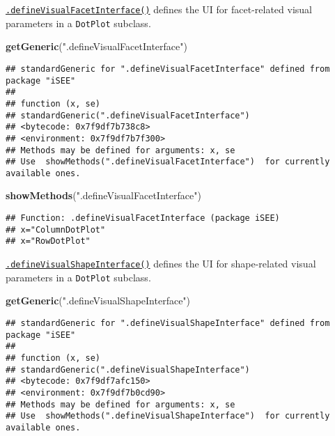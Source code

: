 \documentclass[
]{book}
\newenvironment{Shaded}{\begin{snugshade}}{\end{snugshade}}
\newcommand{\KeywordTok}[1]{\textcolor[rgb]{0.13,0.29,0.53}{\textbf{#1}}}
\newcommand{\NormalTok}[1]{#1}
\newcommand{\StringTok}[1]{\textcolor[rgb]{0.31,0.60,0.02}{#1}}
\begin{document}
\href{https://isee.github.io/iSEE/reference/visual-parameters-generics.html}{\texttt{.defineVisualFacetInterface()}} defines the UI for facet-related visual parameters in a \texttt{DotPlot} subclass.

\begin{Shaded}
\begin{Highlighting}[]
\KeywordTok{getGeneric}\NormalTok{(}\StringTok{".defineVisualFacetInterface"}\NormalTok{)}
\end{Highlighting}
\end{Shaded}

\begin{verbatim}
## standardGeneric for ".defineVisualFacetInterface" defined from package "iSEE"
## 
## function (x, se) 
## standardGeneric(".defineVisualFacetInterface")
## <bytecode: 0x7f9df7b738c8>
## <environment: 0x7f9df7b7f300>
## Methods may be defined for arguments: x, se
## Use  showMethods(".defineVisualFacetInterface")  for currently available ones.
\end{verbatim}

\begin{Shaded}
\begin{Highlighting}[]
\KeywordTok{showMethods}\NormalTok{(}\StringTok{".defineVisualFacetInterface"}\NormalTok{)}
\end{Highlighting}
\end{Shaded}

\begin{verbatim}
## Function: .defineVisualFacetInterface (package iSEE)
## x="ColumnDotPlot"
## x="RowDotPlot"
\end{verbatim}

\href{https://isee.github.io/iSEE/reference/visual-parameters-generics.html}{\texttt{.defineVisualShapeInterface()}} defines the UI for shape-related visual parameters in a \texttt{DotPlot} subclass.

\begin{Shaded}
\begin{Highlighting}[]
\KeywordTok{getGeneric}\NormalTok{(}\StringTok{".defineVisualShapeInterface"}\NormalTok{)}
\end{Highlighting}
\end{Shaded}

\begin{verbatim}
## standardGeneric for ".defineVisualShapeInterface" defined from package "iSEE"
## 
## function (x, se) 
## standardGeneric(".defineVisualShapeInterface")
## <bytecode: 0x7f9df7afc150>
## <environment: 0x7f9df7b0cd90>
## Methods may be defined for arguments: x, se
## Use  showMethods(".defineVisualShapeInterface")  for currently available ones.
\end{verbatim}
\end{document}

